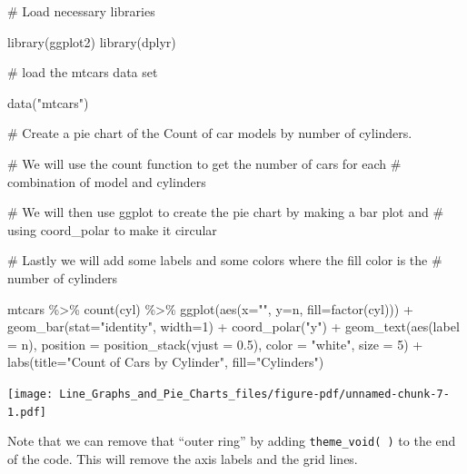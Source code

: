 \documentclass[
  letterpaper,
  DIV=11,
  numbers=noendperiod]{scrreprt}
\newenvironment{Shaded}{\begin{snugshade}}{\end{snugshade}}
\newcommand{\AttributeTok}[1]{\textcolor[rgb]{0.40,0.45,0.13}{#1}}
\newcommand{\CommentTok}[1]{\textcolor[rgb]{0.37,0.37,0.37}{#1}}
\newcommand{\DecValTok}[1]{\textcolor[rgb]{0.68,0.00,0.00}{#1}}
\newcommand{\FloatTok}[1]{\textcolor[rgb]{0.68,0.00,0.00}{#1}}
\newcommand{\FunctionTok}[1]{\textcolor[rgb]{0.28,0.35,0.67}{#1}}
\newcommand{\NormalTok}[1]{\textcolor[rgb]{0.00,0.23,0.31}{#1}}
\newcommand{\SpecialCharTok}[1]{\textcolor[rgb]{0.37,0.37,0.37}{#1}}
\newcommand{\StringTok}[1]{\textcolor[rgb]{0.13,0.47,0.30}{#1}}
\begin{document}
\begin{Shaded}
\begin{Highlighting}[]
\CommentTok{\# Load necessary libraries}

\FunctionTok{library}\NormalTok{(ggplot2)}
\FunctionTok{library}\NormalTok{(dplyr)}

\CommentTok{\# load the mtcars data set}

\FunctionTok{data}\NormalTok{(}\StringTok{"mtcars"}\NormalTok{)}

\CommentTok{\# Create a pie chart of the Count of car models by number of cylinders. }

\CommentTok{\# We will use the count function to get the number of cars for each }
\CommentTok{\# combination of model and cylinders}

\CommentTok{\# We will then use ggplot to create the pie chart by making a bar plot and}
\CommentTok{\# using coord\_polar to make it circular}

\CommentTok{\# Lastly we will add some labels and some colors where the fill color is the }
\CommentTok{\# number of cylinders}

\NormalTok{mtcars }\SpecialCharTok{\%\textgreater{}\%}
  \FunctionTok{count}\NormalTok{(cyl) }\SpecialCharTok{\%\textgreater{}\%}
  \FunctionTok{ggplot}\NormalTok{(}\FunctionTok{aes}\NormalTok{(}\AttributeTok{x=}\StringTok{""}\NormalTok{, }\AttributeTok{y=}\NormalTok{n, }\AttributeTok{fill=}\FunctionTok{factor}\NormalTok{(cyl))) }\SpecialCharTok{+}
  \FunctionTok{geom\_bar}\NormalTok{(}\AttributeTok{stat=}\StringTok{"identity"}\NormalTok{, }\AttributeTok{width=}\DecValTok{1}\NormalTok{) }\SpecialCharTok{+}
  \FunctionTok{coord\_polar}\NormalTok{(}\StringTok{"y"}\NormalTok{) }\SpecialCharTok{+}
  \FunctionTok{geom\_text}\NormalTok{(}\FunctionTok{aes}\NormalTok{(}\AttributeTok{label =}\NormalTok{ n),}
        \AttributeTok{position =} \FunctionTok{position\_stack}\NormalTok{(}\AttributeTok{vjust =} \FloatTok{0.5}\NormalTok{),}
        \AttributeTok{color =} \StringTok{"white"}\NormalTok{, }\AttributeTok{size =} \DecValTok{5}\NormalTok{) }\SpecialCharTok{+}
  \FunctionTok{labs}\NormalTok{(}\AttributeTok{title=}\StringTok{"Count of Cars by Cylinder"}\NormalTok{,}
       \AttributeTok{fill=}\StringTok{"Cylinders"}\NormalTok{)}
\end{Highlighting}
\end{Shaded}

\texttt{[image: Line\_Graphs\_and\_Pie\_Charts\_files/figure-pdf/unnamed-chunk-7-1.pdf]}

Note that we can remove that ``outer ring'' by adding
\texttt{theme\_void(\ )} to the end of the code. This will remove the
axis labels and the grid lines.
\end{document}
